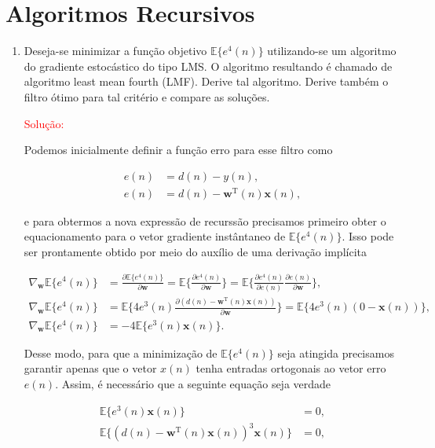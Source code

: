 \documentclass[a4paper,10pt]{article}
\begin{document}
	\newpage
	\section*{Algoritmos Recursivos}
	
		\begin{enumerate}
			
			\item Deseja-se minimizar a função objetivo $\mathbb{E}\{e^{4}(n)\}$ utilizando-se um algoritmo do gradiente estocástico do tipo LMS. O algoritmo resultando é chamado de algoritmo least mean fourth (LMF). Derive tal algoritmo. Derive também o ﬁltro ótimo para tal critério e compare as soluções.
			
				\textcolor{red}{Solução:}
				
				Podemos inicialmente definir a função erro para esse filtro como
				
				\begin{align}
					e(n) &= d(n) - y(n), \\
					e(n) &= d(n) - \mathbf{w}^{\text{T}}(n)\mathbf{x}(n),
				\end{align}
				
				e para obtermos a nova expressão de recurssão precisamos primeiro obter o equacionamento para o vetor gradiente instântaneo de $\mathbb{E}\{e^{4}(n)\}$. Isso pode ser prontamente obtido por meio do auxílio de uma derivação implícita

				\begin{align}
					\nabla_{\mathbf{w}} \mathbb{E}\{e^{4}(n)\} &= \frac{\partial \mathbb{E}\{e^{4}(n)\}}{\partial \mathbf{w}} = \mathbb{E}\{ \frac{\partial e^{4}(n)}{\partial \mathbf{w}}\} = \mathbb{E}\{ \frac{\partial e^{4}(n)}{\partial e(n)} \frac{\partial e(n) }{\partial \mathbf{w}}\}, \\
					\nabla_{\mathbf{w}} \mathbb{E}\{e^{4}(n)\} &= \mathbb{E}\{4 e^{3}(n) \frac{\partial (d(n) - \mathbf{w}^{\text{T}}(n)\mathbf{x}(n)) }{\partial \mathbf{w}}\} = \mathbb{E}\{4 e^{3}(n) (0 - \mathbf{x}(n))\}, \\
					\nabla_{\mathbf{w}} \mathbb{E}\{e^{4}(n)\} &= - 4 \mathbb{E}\{e^{3}(n) \mathbf{x}(n)\}.
				\end{align}
			
				Desse modo, para que a minimização de $\mathbb{E}\{e^{4}(n)\}$ seja atingida precisamos garantir apenas que o vetor $x(n)$ tenha entradas ortogonais ao vetor erro $e(n)$. Assim, é necessário que a seguinte equação seja verdade

				\begin{align}
					\mathbb{E}\{e^{3}(n) \mathbf{x}(n)\} &= 0, \\
					\mathbb{E}\{(d(n) - \mathbf{w}^{\text{T}}(n)\mathbf{x}(n))^{3} \mathbf{x}(n)\} &= 0, 
				\end{align}


\end{enumerate}
\end{document}
